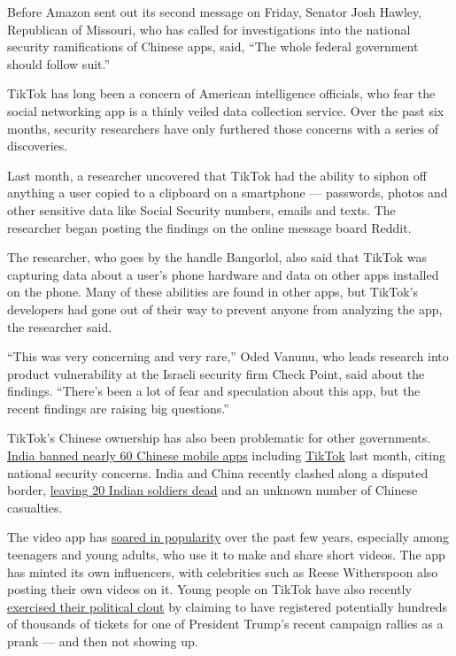 Before Amazon sent out its second message on Friday, Senator Josh
Hawley, Republican of Missouri, who has called for investigations into
the national security ramifications of Chinese apps, said, ``The whole
federal government should follow suit.''

TikTok has long been a concern of American intelligence officials, who
fear the social networking app is a thinly veiled data collection
service. Over the past six months, security researchers have only
furthered those concerns with a series of discoveries.

Last month, a researcher uncovered that TikTok had the ability to siphon
off anything a user copied to a clipboard on a smartphone --- passwords,
photos and other sensitive data like Social Security numbers, emails and
texts. The researcher began posting the findings on the online message
board Reddit.

The researcher, who goes by the handle Bangorlol, also said that TikTok
was capturing data about a user's phone hardware and data on other apps
installed on the phone. Many of these abilities are found in other apps,
but TikTok's developers had gone out of their way to prevent anyone from
analyzing the app, the researcher said.

``This was very concerning and very rare,'' Oded Vanunu, who leads
research into product vulnerability at the Israeli security firm Check
Point, said about the findings. ``There's been a lot of fear and
speculation about this app, but the recent findings are raising big
questions.''

TikTok's Chinese ownership has also been problematic for other
governments.
\href{https://www.nytimes3xbfgragh.onion/2020/06/29/world/asia/tik-tok-banned-india-china.html}{India
banned nearly 60 Chinese mobile apps} including
\href{https://www.nytimes3xbfgragh.onion/2020/06/30/technology/india-china-tiktok.html}{TikTok}
last month, citing national security concerns. India and China recently
clashed along a disputed border,
\href{https://www.nytimes3xbfgragh.onion/2020/06/16/world/asia/indian-china-border-clash.html}{leaving
20 Indian soldiers dead} and an unknown number of Chinese casualties.

The video app has
\href{https://www.nytimes3xbfgragh.onion/2019/03/10/style/what-is-tik-tok.html}{soared
in popularity} over the past few years, especially among teenagers and
young adults, who use it to make and share short videos. The app has
minted its own influencers, with celebrities such as Reese Witherspoon
also posting their own videos on it. Young people on TikTok have also
recently
\href{https://www.nytimes3xbfgragh.onion/2020/06/21/style/tiktok-trump-rally-tulsa.html}{exercised
their political clout} by claiming to have registered potentially
hundreds of thousands of tickets for one of President Trump's recent
campaign rallies as a prank --- and then not showing up.

